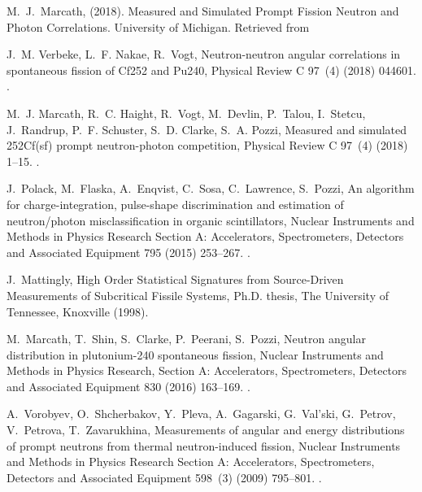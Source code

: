 \documentclass[preprint,12pt]{elsarticle}
\begin{document}
\begin{thebibliography}{10}
	M.~J.~Marcath, (2018). Measured and Simulated Prompt Fission Neutron and Photon Correlations. University of Michigan. Retrieved from \newblock \href {https://deepblue.lib.umich.edu/handle/2027.42/147560} {}
	
	J.~M. Verbeke, L.~F. Nakae, R.~Vogt, {Neutron-neutron angular correlations in
		spontaneous fission of Cf252 and Pu240}, Physical Review C 97~(4) (2018)
	044601.
	\newblock \href {https://doi.org/10.1103/PhysRevC.97.044601}
	{}.
	
	M.~J. Marcath, R.~C. Haight, R.~Vogt, M.~Devlin, P.~Talou, I.~Stetcu,
	J.~Randrup, P.~F. Schuster, S.~D. Clarke, S.~A. Pozzi, {Measured and
		simulated 252Cf(sf) prompt neutron-photon competition}, Physical Review C
	97~(4) (2018) 1--15.
	\newblock \href {https://doi.org/10.1103/PhysRevC.97.044622}
	{}.
	
	J.~Polack, M.~Flaska, A.~Enqvist, C.~Sosa, C.~Lawrence, S.~Pozzi, {An algorithm
		for charge-integration, pulse-shape discrimination and estimation of
		neutron/photon misclassification in organic scintillators}, Nuclear
	Instruments and Methods in Physics Research Section A: Accelerators,
	Spectrometers, Detectors and Associated Equipment 795 (2015) 253--267.
	\newblock \href {https://doi.org/10.1016/j.nima.2015.05.048}
	{}.
	
	J.~Mattingly, {High Order Statistical Signatures from Source-Driven
		Measurements of Subcritical Fissile Systems}, Ph.D. thesis, The University of
	Tennessee, Knoxville (1998).
	
	M.~Marcath, T.~Shin, S.~Clarke, P.~Peerani, S.~Pozzi, {Neutron angular
		distribution in plutonium-240 spontaneous fission}, Nuclear Instruments and
	Methods in Physics Research, Section A: Accelerators, Spectrometers,
	Detectors and Associated Equipment 830 (2016) 163--169.
	\newblock \href {https://doi.org/10.1016/j.nima.2016.05.064}
	{}.
	
	A.~Vorobyev, O.~Shcherbakov, Y.~Pleva, A.~Gagarski, G.~Val'ski, G.~Petrov,
	V.~Petrova, T.~Zavarukhina, {Measurements of angular and energy distributions
		of prompt neutrons from thermal neutron-induced fission}, Nuclear Instruments
	and Methods in Physics Research Section A: Accelerators, Spectrometers,
	Detectors and Associated Equipment 598~(3) (2009) 795--801.
	\newblock \href {https://doi.org/10.1016/j.nima.2008.10.017}
	{}.
	

\end{thebibliography}
\end{document}
